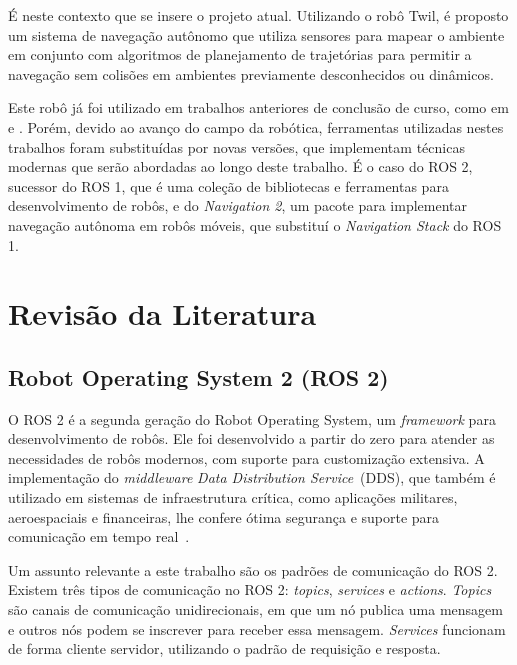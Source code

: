 \documentclass[repeatfields,xlists,xpacks,oneside,yearsonly]{ufrgscca}
\begin{document}
É neste contexto que se insere o projeto atual.
Utilizando o robô Twil, é proposto um sistema de navegação autônomo que utiliza
sensores para mapear o ambiente em conjunto com algoritmos de planejamento
de trajetórias para permitir a navegação sem colisões em ambientes previamente
desconhecidos ou dinâmicos.

Este robô já foi utilizado em trabalhos anteriores de conclusão de curso,
como em \textcite{petry_tcc} e \textcite{rahul_tcc}.
Porém, devido ao avanço do campo da robótica, ferramentas utilizadas
nestes trabalhos foram substituídas por novas versões, que implementam
técnicas modernas que serão abordadas ao longo deste trabalho.
É o caso do ROS 2, sucessor do ROS 1, que é uma coleção de bibliotecas e
ferramentas para desenvolvimento de robôs, e do \textit{Navigation 2}, um
pacote para implementar navegação autônoma em robôs móveis, que substituí o
\textit{Navigation Stack} do ROS 1.

\chapter{Revisão da Literatura}
\label{revisao}

\section{Robot Operating System 2 (ROS 2)}

O ROS 2 é a segunda geração do Robot Operating System,
um \textit{framework} para desenvolvimento de robôs.
Ele foi desenvolvido a partir do zero para atender as necessidades de robôs modernos,
com suporte para customização extensiva.
A implementação do \textit{middleware} \textit{Data Distribution Service}~(DDS),
que também é utilizado em sistemas de infraestrutura crítica, como aplicações militares,
aeroespaciais e financeiras, lhe confere ótima segurança e suporte para comunicação em
tempo real~\cite{ROS2Article}.

Um assunto relevante a este trabalho são os padrões de comunicação do ROS 2.
Existem três tipos de comunicação no ROS 2: \textit{topics}, \textit{services} e \textit{actions}.
\textit{Topics} são canais de comunicação unidirecionais, em que um nó publica uma mensagem
e outros nós podem se inscrever para receber essa mensagem.
\textit{Services} funcionam de forma cliente servidor, utilizando o padrão de requisição e resposta.
\end{document}
